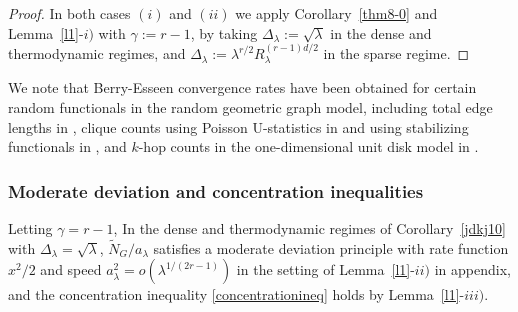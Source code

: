 \documentclass[bj,authoryear,noshowframe]{imsart}
\theoremstyle{plain}
\theoremstyle{remark}
\newtheorem{remark}[prop]{Remark}
\begin{document}
 \begin{proof}
   In both cases $(i)$ and $(ii)$ we apply Corollary~\ref{thm8-0} 
   and Lemma~\ref{l1}-$i)$ with $\gamma :=r-1$,
   by taking 
   $\Delta_\lambda:=
   \sqrt{\lambda}$
   in the dense and  thermodynamic regimes,
   and 
   $\Delta_\lambda:= \lambda^{r/2} R_\lambda^{(r-1)d/2}$
   in the sparse regime.
 \end{proof} 
 We note that Berry-Esseen convergence rates have been obtained
 for certain random functionals in the random geometric graph
 model, including total edge lengths in \cite[Corollary~4.3]{schulte},
 clique counts using Poisson U-statistics in \cite[Theorem~4.1]{reitzner}  
 and using stabilizing functionals in \cite[Theorem~3.15]{lachiezerey4},
 and $k$-hop counts in the one-dimensional unit disk model in
 \cite[Proposition~8.1]{privaultkhops}. 
 
 
 
 \subsubsection*{Moderate deviation and concentration inequalities} 
 \noindent 
 Letting $\gamma =r-1$, 
 In the dense and thermodynamic regimes of 
 Corollary~\ref{jdkj10} with $\Delta_\lambda=
 \sqrt{\lambda}$, $\widetilde{N}_G/a_\lambda$
     satisfies a moderate deviation principle
 with rate function $x^2/2$
 and speed $a_\lambda^2 = o( \lambda^{1/(2r - 1)} )$
 in the setting of Lemma~\ref{l1}-$ii)$ in appendix,
 and the concentration inequality 
 \eqref{concentrationineq} holds by Lemma~\ref{l1}-$iii)$. 
 
\end{document}
